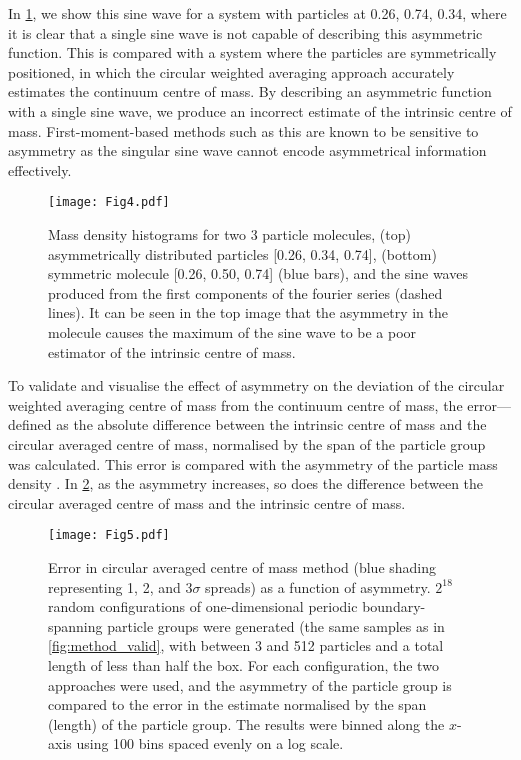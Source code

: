 \documentclass[reprint,superscriptaddress,nobibnotes,amsmath,amssymb,aip]{revtex4-2}
\begin{document}
In \cref{fig:sine_wave_assym}, we show this sine wave for a system with particles at 0.26, 0.74, 0.34, where it is clear that a single sine wave is not capable of describing this asymmetric function. 
This is compared with a system where the particles are symmetrically positioned, in which the circular weighted averaging approach accurately estimates the continuum centre of mass. 
By describing an asymmetric function with a single sine wave, we produce an incorrect estimate of the intrinsic centre of mass. 
First-moment-based methods such as this are known to be sensitive to asymmetry \cite{teague_robust_2018} as the singular sine wave cannot encode asymmetrical information effectively. 
%
\begin{figure}
    \centering
    \texttt{[image: Fig4.pdf]}
    \caption{Mass density histograms for two 3 particle molecules, (top) asymmetrically distributed particles [0.26, 0.34, 0.74], (bottom) symmetric molecule [0.26, 0.50, 0.74] (blue bars), and the sine waves produced from the first components of the fourier series (dashed lines). It can be seen in the top image that the asymmetry in the molecule causes the maximum of the sine wave to be a poor estimator of the intrinsic centre of mass. }
    \label{fig:sine_wave_assym}
\end{figure}
%

To validate and visualise the effect of asymmetry on the deviation of the circular weighted averaging centre of mass from the continuum centre of mass, the error—defined as the absolute difference between the intrinsic centre of mass and the circular averaged centre of mass, normalised by the span of the particle group was calculated.
This error is compared with the asymmetry of the particle mass density \cite{xioajun_on_1991}. 
In \cref{fig:method_comparison}, as the asymmetry increases, so does the difference between the circular averaged centre of mass and the intrinsic centre of mass. 
%
\begin{figure}
    \centering
    \texttt{[image: Fig5.pdf]}
    \caption{Error in circular averaged centre of mass method (blue shading representing 1, 2, and 3$\sigma$ spreads) as a function of asymmetry.
    $2^{18}$ random configurations of one-dimensional periodic boundary-spanning particle groups were generated (the same samples as in \cref{fig:method_valid}, with between 3 and 512 particles and a total length of less than half the box. 
    For each configuration, the two approaches were used, and the asymmetry of the particle group\cite{xioajun_on_1991} is compared to the error in the estimate normalised by the span (length) of the particle group. 
    The results were binned along the $x$-axis using 100 bins spaced evenly on a log scale.}
    \label{fig:method_comparison}
\end{figure}


\end{document}
